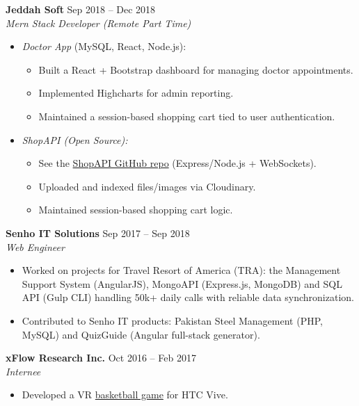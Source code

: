 \documentclass{res} %
\begin{document}
\begin{resume}
  \textbf{Jeddah Soft} \hfill Sep 2018 -- Dec 2018\\
  {\sl Mern Stack Developer (Remote Part Time)}
  \begin{itemize}
    \item \emph{Doctor App} (MySQL, React, Node.js):
      \begin{itemize}
        \item Built a React + Bootstrap dashboard for managing doctor appointments.
        \item Implemented Highcharts for admin reporting.
        \item Maintained a session-based shopping cart tied to user authentication.
      \end{itemize}
    \item \emph{ShopAPI (Open Source):}
      \begin{itemize}
        \item See the \href{https://github.com/msohailse/shopapi}{ShopAPI GitHub repo} (Express/Node.js + WebSockets).
        \item Uploaded and indexed files/images via Cloudinary.
        \item Maintained session-based shopping cart logic.
      \end{itemize}
  \end{itemize}

  \textbf{Senho IT Solutions} \hfill Sep 2017 -- Sep 2018\\
  {\sl Web Engineer} \smallskip
  \begin{itemize}
    \item Worked on projects for Travel Resort of America (TRA): the Management Support System (AngularJS), MongoAPI (Express.js, MongoDB) and SQL API (Gulp CLI) handling 50k+ daily calls with reliable data synchronization.
    \item Contributed to Senho IT products: Pakistan Steel Management (PHP, MySQL) and QuizGuide (Angular full-stack generator).
  \end{itemize}

  \textbf{xFlow Research Inc.} \hfill Oct 2016 -- Feb 2017\\
  {\sl Internee} \smallskip
  \begin{itemize}
    \item Developed a VR \href{https://github.com/msohailse/basketBallGame}{basketball game} for HTC Vive.
  \end{itemize}


\end{resume}
\end{document}
